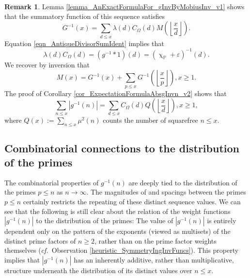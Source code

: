\documentclass[11pt,reqno,a4letter]{article}
\numberwithin{figure}{section}
\numberwithin{table}{section}
\newcommand{\cf}{\textit{cf.\ }}
\renewcommand{\chi}{\upchi}
\newcommand{\Floor}[2]{\ensuremath{\left\lfloor \frac{#1}{#2} \right\rfloor}}
\theoremstyle{plain}
\numberwithin{theorem}{section}
\theoremstyle{definition}
\newtheorem{remark}[theorem]{Remark}
\begin{document}
\begin{remark} 
Lemma \ref{lemma_AnExactFormulaFor_gInvByMobiusInv_v1} 
shows that the summatory 
function of this sequence satisfies 
\[
G^{-1}(x) = \sum_{d \leq x} \lambda(d) C_{\Omega}(d) M\left(\Floor{x}{d}\right). 
\]
Equation \eqref{eqn_AntiqueDivisorSumIdent} implies that 
$$\lambda(d) C_{\Omega}(d) = (g^{-1} \ast 1)(d) = (\chi_{\mathbb{P}} + \varepsilon)^{-1}(d).$$ 
We recover by inversion that 
\begin{equation}
\label{eqn_RmkInitialConnectionOfMxToGInvx_ProvedByInversion_v1} 
M(x) = G^{-1}(x) + \sum_{p \leq x} G^{-1}\left(\Floor{x}{p}\right), x \geq 1. 
\end{equation}
The proof of Corollary \ref{cor_ExpectationFormulaAbsgInvn_v2} 
shows that 
\[
\sum_{n \leq x} |g^{-1}(n)| = \sum_{d \leq x} C_{\Omega}(d) Q\left(\Floor{x}{d}\right), x \geq 1, 
\]
where $Q(x) := \sum_{n \leq x} \mu^2(n)$ counts the number of squarefree $n \leq x$. 
\end{remark} 

\subsection{Combinatorial connections to the distribution of the primes} 
\label{subSection_AConnectionToDistOfThePrimes} 

The combinatorial properties of $g^{-1}(n)$ are deeply tied to the distribution of the primes 
$p \leq n$ as $n \rightarrow \infty$. 
The magnitudes of and spacings between the primes $p \leq n$ certainly restricts the 
repeating of these distinct sequence values. 
We can see that the following 
is still clear about the relation of the weight functions $|g^{-1}(n)|$ to the 
distribution of the primes: 
The value of $|g^{-1}(n)|$ is entirely dependent only on the pattern of the exponents 
(viewed as multisets) of the distinct prime factors of $n \geq 2$, rather than on the 
prime factor weights themselves 
(\cf Observation \ref{heuristic_SymmetryIngInvFuncs}). 
This property implies that $|g^{-1}(n)|$ has an inherently additive, rather than 
multiplicative, structure underneath the distribution of its distinct values over $n \leq x$. 
\end{document}
